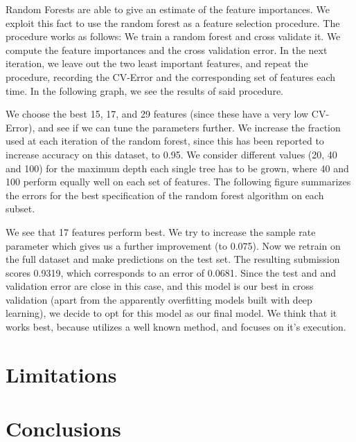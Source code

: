 \documentclass[paper=a4, fontsize=11pt]{scrartcl}
\numberwithin{equation}{section}
\numberwithin{figure}{section}
\numberwithin{table}{section}
\begin{document}
Random Forests are able to give an estimate of the feature importances. We exploit this fact to use the random forest as a feature selection procedure. The procedure works as follows: We train a random forest and cross validate it. 
We compute the feature importances and the cross validation error. In the next iteration, we leave out the two least important features, and repeat the procedure, recording the CV-Error and the corresponding set of features each time. 
In the following graph, we see the results of said procedure.

We choose the best 15, 17, and 29 features (since these have a very low CV-Error), and see if we can tune the parameters further. We increase the fraction used at each iteration of the random forest, since this has been reported to increase accuracy on this dataset, to 0.95. We consider different values (20, 40 and 100) for the maximum depth each single tree has to be grown, where 40 and 100 perform equally well on each set of features. 
The following figure summarizes the errors for the best specification of the random forest algorithm on each subset. 

We see that 17 features perform best. We try to increase the sample rate parameter which gives us a further improvement (to 0.075). Now we retrain on the full dataset and make predictions on the test set. The resulting submission scores 0.9319, which corresponds to an error of 0.0681. Since the test and and validation error are close in this case, and this model is our best in cross validation (apart from the apparently overfitting models built with deep learning), we decide to opt for this model as our final model. We think that it works best, because utilizes a well known method, and focuses on it's execution. 




\section{Limitations}



\section{Conclusions}

\end{document}
